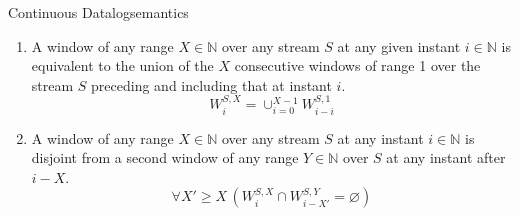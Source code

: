 \begin{nestedsection}{Continuous Datalog}{semantics}
\begin{enumerate}
\begin{equation*}
			\end{equation*}
		\item\label{axiom:continuous datalog: window composition}
			A window of any range ${X \in \mathbb{N}}$ over any stream $S$ at any given instant ${i \in \mathbb{N}}$ is equivalent to the union of the $X$ consecutive windows of range 1 over the stream $S$ preceding and including that at instant $i$.
			\begin{equation*}
				W^{S,X}_{i} = \mathop{\cup}_{i=0}^{X-1} W^{S,1}_{i-i}
			\end{equation*}
		\item\label{axiom:continuous datalog: window disjointness}
			A window of any range ${X \in \mathbb{N}}$ over any stream $S$ at any instant ${i \in \mathbb{N}}$ is disjoint from a second window of any range ${Y \in \mathbb{N}}$ over $S$ at any instant after ${i - X}$.
			\begin{equation*}
				\forall X' \geq X \, \left( W^{S,X}_{i} \cap W^{S,Y}_{i-X'} = \varnothing \right)
			\end{equation*}
		\setcounter{continuousDatalogAxioms}{\theenumi}
	\end{enumerate}


\end{nestedsection}
